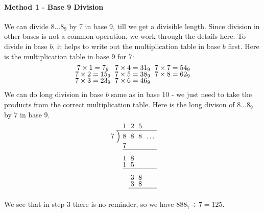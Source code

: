 \documentclass[11pt,twoside]{scrartcl}
\begin{document}
\begin{problem}
\begin{sketch}
        \paragraph{Method 1 - Base 9 Division} We can divide $8\ldots8_9$ by 7 in base 9, till we get a divisible length. Since division in other bases is not a common operation, we work through the details here. To divide in base $b$, it helps to write out the multiplication table in base $b$ first. Here is the multiplication table in base $9$ for $7$:
        \begin{align*}
            \begin{array}{*3c}
                7 \times 1 = 7_9 & 7 \times 4 = 31_9 & 7 \times 7 = 54_9 \\
                7 \times 2 = 15_9 & 7 \times 5 = 38_9 & 7 \times 8 = 62_9 \\
                7 \times 3 = 23_9 & 7 \times 6 = 46_9 &
            \end{array}
        \end{align*} 
        We can do long division in base $b$ same as in base 10 - we just need to take the products from the correct multiplication table. Here is the long divison of $8\ldots8_9$ by 7 in base 9.
        \begin{align*}
            \renewcommand\arraystretch{.75}\renewcommand\arraycolsep{3pt}
            \begin{array}{r@{\hskip\arraycolsep}c@{\hskip\arraycolsep}*4r} %
              &&1&2&5\\
              \cline{2-6} %
             7&\Big)&8&8&8&\ldots \\
              &&7&& \\
              \cline{3-6}\\
              &&1&8& \\
              &&1&5& \\
              \cline{3-6}\\
              &&&3&8 \\
              &&&3&8 \\
              \cline{4-6}\\
            \end{array}
          \end{align*}
          We see that in step 3 there is no reminder, so we have $888_7 \div 7 = 125$.


\end{sketch}
\end{problem}
\end{document}
